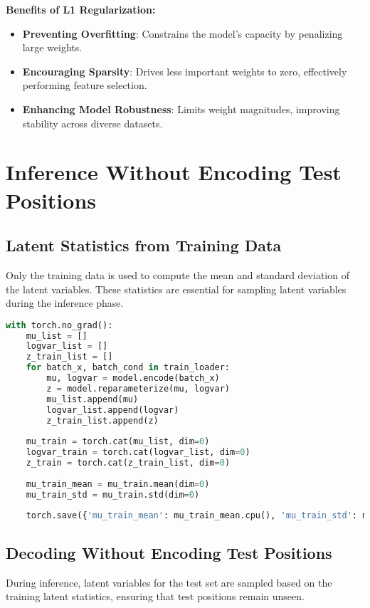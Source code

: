 \documentclass[10pt]{article}
\begin{document}
\textbf{Benefits of L1 Regularization:}
\begin{itemize}
    \item \textbf{Preventing Overfitting}: Constrains the model's capacity by penalizing large weights.
    \item \textbf{Encouraging Sparsity}: Drives less important weights to zero, effectively performing feature selection.
    \item \textbf{Enhancing Model Robustness}: Limits weight magnitudes, improving stability across diverse datasets.
\end{itemize}

\section{Inference Without Encoding Test Positions}

\subsection{Latent Statistics from Training Data}
Only the training data is used to compute the mean and standard deviation of the latent variables. These statistics are essential for sampling latent variables during the inference phase.

\begin{lstlisting}[language=Python, caption=Computing Latent Statistics]
with torch.no_grad():
    mu_list = []
    logvar_list = []
    z_train_list = []
    for batch_x, batch_cond in train_loader:
        mu, logvar = model.encode(batch_x)
        z = model.reparameterize(mu, logvar)
        mu_list.append(mu)
        logvar_list.append(logvar)
        z_train_list.append(z)
    
    mu_train = torch.cat(mu_list, dim=0)
    logvar_train = torch.cat(logvar_list, dim=0)
    z_train = torch.cat(z_train_list, dim=0)
    
    mu_train_mean = mu_train.mean(dim=0)
    mu_train_std = mu_train.std(dim=0)
    
    torch.save({'mu_train_mean': mu_train_mean.cpu(), 'mu_train_std': mu_train_std.cpu()}, 'latent_stats.pt')
\end{lstlisting}

\subsection{Decoding Without Encoding Test Positions}
During inference, latent variables for the test set are sampled based on the training latent statistics, ensuring that test positions remain unseen.
\end{document}
